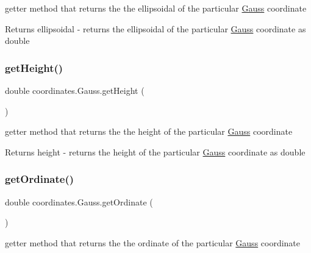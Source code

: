 getter method that returns the the ellipsoidal of the particular \hyperlink{classcoordinates_1_1_gauss}{Gauss} coordinate 

\begin{DoxyReturn}{Returns}
ellipsoidal -\/ returns the ellipsoidal of the particular \hyperlink{classcoordinates_1_1_gauss}{Gauss} coordinate as double 
\end{DoxyReturn}
\mbox{\label{classcoordinates_1_1_gauss_a3bc39fe23752a9bccac68015c799f3fc}} 
\subsubsection{\texorpdfstring{get\+Height()}{getHeight()}}
{\footnotesize\ttfamily double coordinates.\+Gauss.\+get\+Height (\begin{DoxyParamCaption}{ }\end{DoxyParamCaption})}



getter method that returns the the height of the particular \hyperlink{classcoordinates_1_1_gauss}{Gauss} coordinate 

\begin{DoxyReturn}{Returns}
height -\/ returns the height of the particular \hyperlink{classcoordinates_1_1_gauss}{Gauss} coordinate as double 
\end{DoxyReturn}
\mbox{\label{classcoordinates_1_1_gauss_a751c889d6cc9b2acb5eeb42d888efc0f}} 
\subsubsection{\texorpdfstring{get\+Ordinate()}{getOrdinate()}}
{\footnotesize\ttfamily double coordinates.\+Gauss.\+get\+Ordinate (\begin{DoxyParamCaption}{ }\end{DoxyParamCaption})}



getter method that returns the the ordinate of the particular \hyperlink{classcoordinates_1_1_gauss}{Gauss} coordinate 

